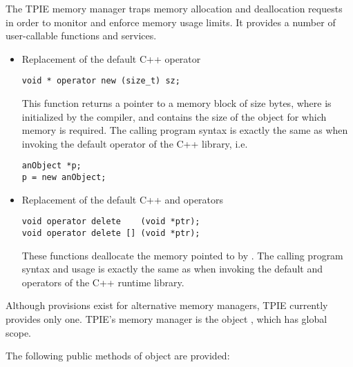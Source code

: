 The TPIE memory manager  traps memory
allocation and deallocation requests in order to monitor
and enforce memory usage limits. It provides a number of
user-callable functions and services.

\begin{itemize}
\item Replacement of the default C++  operator
\begin{verbatim}
void * operator new (size_t) sz;
\end{verbatim}
This function returns a pointer to a memory block of size
 bytes, where  is initialized by the
compiler, and contains the size of the object
for which memory is required. The calling program syntax is
exactly the same as when invoking the default 
operator of the C++ library, i.e. 

\begin{verbatim}
anObject *p;
p = new anObject; 
\end{verbatim}

\item Replacement of the default C++  and
 operators
\begin{verbatim}
void operator delete    (void *ptr);
void operator delete [] (void *ptr);
\end{verbatim}

These functions deallocate the memory pointed to by
. The calling program syntax and usage is exactly
the same as when invoking the default  and
 operators of the C++ runtime library.

\end{itemize}

Although provisions exist for alternative memory managers,
TPIE currently provides only one. TPIE's memory manager is the object
, which has global scope. 

The following public methods of object  are
provided:

